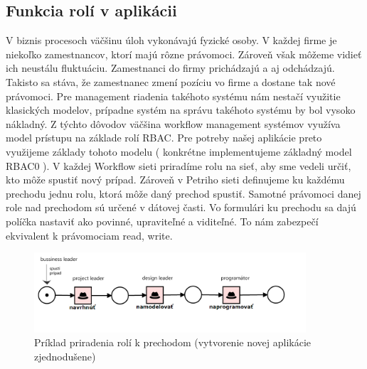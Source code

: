 

\subsection{Funkcia rolí v aplikácii}
V biznis procesoch väčšinu úloh vykonávajú fyzické osoby. V každej firme je niekoľko zamestnancov, ktorí majú rôzne právomoci. Zároveň však môžeme vidieť ich neustálu fluktuáciu. Zamestnanci do firmy prichádzajú a aj odchádzajú. Takisto sa stáva, že zamestnanec zmení pozíciu vo firme a dostane tak nové právomoci. Pre management riadenia takéhoto systému nám nestačí využitie klasických modelov, prípadne systém na správu takéhoto systému by bol vysoko nákladný. Z týchto dôvodov väčšina workflow management systémov využíva model  prístupu na základe rolí RBAC. Pre potreby našej aplikácie preto využijeme základy tohoto modelu ( konkrétne implementujeme základný model RBAC0 ). V každej Workflow sieti priradíme rolu na sieť, aby sme vedeli určiť, kto môže spustiť nový prípad. Zároveň v Petriho sieti definujeme ku každému prechodu jednu rolu, ktorá môže daný prechod spustiť. Samotné právomoci danej role nad prechodom sú určené v dátovej časti. Vo formulári ku prechodu sa dajú políčka nastaviť ako povinné, upraviteľné a viditeľné. To nám zabezpečí ekvivalent k právomociam read, write. 

\begin{figure}[h]
	\centerline{\includegraphics[width=0.9\textwidth]{images/vyvoj_role}}
	\caption{Príklad priradenia rolí k prechodom (vytvorenie novej aplikácie zjednodušene)}
	\label{obr:role_na prechody}
\end{figure}



